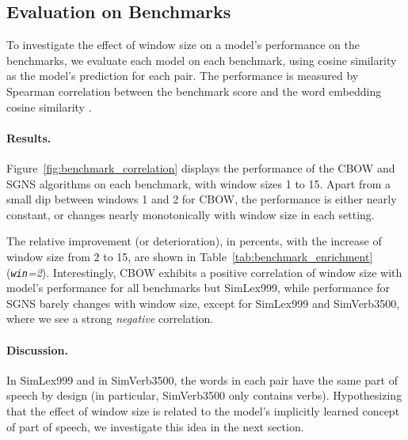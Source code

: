 \documentclass[11pt,a4paper]{article}
\begin{document}
    \subsection{Evaluation on Benchmarks}\label{sec:eval_exp}
    
    To investigate the effect of window size on a model's performance on the benchmarks,
    we evaluate each model on each benchmark, using cosine similarity
    as the model's prediction for each pair.
    The performance is measured by Spearman correlation between the benchmark score
    and the word embedding cosine similarity \cite{levy2015improving}.
    
    \paragraph{Results.}
    
    Figure~\ref{fig:benchmark_correlation} displays the performance of the CBOW and SGNS
    algorithms on each benchmark, with window sizes 1 to 15.
    Apart from a small dip between windows 1 and 2 for
    CBOW,
    the performance is either nearly constant,
    or changes nearly monotonically with window size in each setting.
    
    The relative improvement (or deterioration),
    in percents, with the increase of window size from 2 to 15,
    are shown in Table~\ref{tab:benchmark_enrichment} (\textit{\Delta \texttt{win}=2}).
    Interestingly, CBOW exhibits a positive correlation of window size with model's performance
    for all benchmarks but SimLex999,
    while performance for SGNS barely changes with window size,
    except for SimLex999 and SimVerb3500, where we see a strong \textit{negative} correlation.
    
    \paragraph{Discussion.}
    
    In SimLex999 and in SimVerb3500, the words in each pair have the same part of speech by design
    (in particular, SimVerb3500 only contains verbs).
    Hypothesizing that the effect of window size is related to the model's
    implicitly learned concept of part of speech, we investigate this idea in the next section.
    
\end{document}
